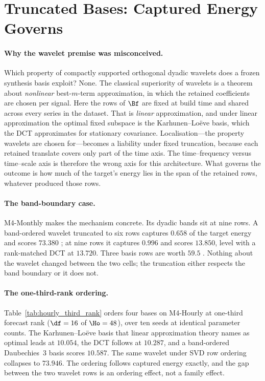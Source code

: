 \section{Truncated Bases: Captured Energy Governs}\label{sec:truncation}

\paragraph{Why the wavelet premise was misconceived.}
Which property of compactly supported orthogonal dyadic wavelets does a frozen
synthesis basis exploit? None. The classical superiority of wavelets is a theorem
about \emph{nonlinear} best-$m$-term approximation, in which the retained
coefficients are chosen per signal. Here the rows of $\Bf$ are fixed at build time
and shared across every series in the dataset. That is \emph{linear}
approximation, and under linear approximation the optimal fixed subspace is the
Karhunen--Lo\"eve basis, which the DCT approximates for stationary covariance.
Localisation---the property wavelets are chosen for---becomes a liability under
fixed truncation, because each retained translate covers only part of the time
axis. The time--frequency versus time--scale axis is therefore the wrong axis for
this architecture. What governs the outcome is how much of the target's energy
lies in the span of the retained rows, whatever produced those rows.

\paragraph{The band-boundary case.}
M4-Monthly makes the mechanism concrete. Its dyadic bands sit at nine rows. A
band-ordered wavelet truncated to six rows captures $0.658$ of the target energy
and scores $73.380$ \smape; at nine rows it captures $0.996$ and scores $13.850$,
level with a rank-matched DCT at $13.720$. Three basis rows are worth $59.5$
\smape. Nothing about the wavelet changed between the two cells; the truncation
either respects the band boundary or it does not.

\paragraph{The one-third-rank ordering.}
Table~\ref{tab:hourly_third_rank} orders four bases on M4-Hourly at one-third
forecast rank ($\df = 16$ of $\Ho = 48$), over ten seeds at identical parameter
counts. The Karhunen--Lo\"eve basis that linear approximation theory names as
optimal leads at $10.054$, the DCT follows at $10.287$, and a band-ordered
Daubechies~3 basis scores $10.587$. The same wavelet under SVD row ordering
collapses to $73.946$. The ordering follows captured energy exactly, and the gap
between the two wavelet rows is an ordering effect, not a family effect.

